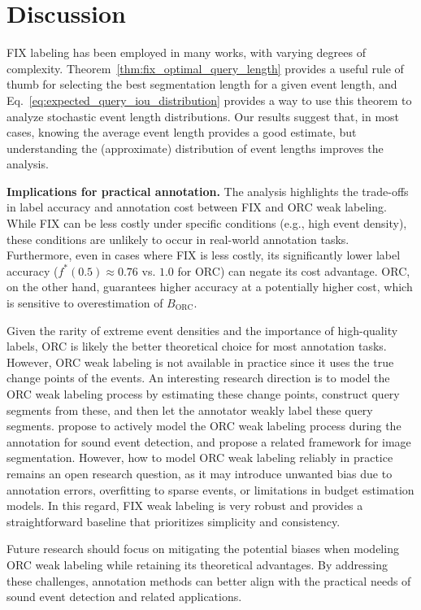 \section{Discussion}
\label{sec:discussion}

FIX labeling has been employed in many works, with varying degrees of complexity. Theorem~\ref{thm:fix_optimal_query_length} provides a useful rule of thumb for selecting the best segmentation length for a given event length, and Eq.~\ref{eq:expected_query_iou_distribution} provides a way to use this theorem to analyze stochastic event length distributions. Our results suggest that, in most cases, knowing the average event length provides a good estimate, but understanding the (approximate) distribution of event lengths improves the analysis.

\textbf{Implications for practical annotation.} The analysis highlights the trade-offs in label accuracy and annotation cost between FIX and ORC weak labeling. While FIX can be less costly under specific conditions (e.g., high event density), these conditions are unlikely to occur in real-world annotation tasks. Furthermore, even in cases where FIX is less costly, its significantly lower label accuracy ($f^*(0.5) \approx 0.76$ vs. $1.0$ for ORC) can negate its cost advantage. ORC, on the other hand, guarantees higher accuracy at a potentially higher cost, which is sensitive to overestimation of $B_{\text{ORC}}$. 

Given the rarity of extreme event densities and the importance of high-quality labels, ORC is likely the better theoretical choice for most annotation tasks. However, ORC weak labeling is not available in practice since it uses the true change points of the events. An interesting research direction is to model the ORC weak labeling process by estimating these change points, construct query segments from these, and then let the annotator weakly label these query segments. \citet{Martinsson2024} propose to actively model the ORC weak labeling process during the annotation for sound event detection, and \citet{Kim2023} propose a related framework for image segmentation. However, how to model ORC weak labeling reliably in practice remains an open research question, as it may introduce unwanted bias due to annotation errors, overfitting to sparse events, or limitations in budget estimation models. In this regard, FIX weak labeling is very robust and provides a straightforward baseline that prioritizes simplicity and consistency.

Future research should focus on mitigating the potential biases when modeling ORC weak labeling while retaining its theoretical advantages. By addressing these challenges, annotation methods can better align with the practical needs of sound event detection and related applications.

